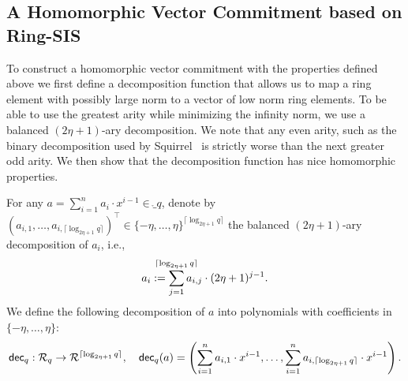 \subsection{A Homomorphic Vector Commitment based on Ring-SIS}
To construct a homomorphic vector commitment with the properties defined above we first define a decomposition function that allows us to map a ring element with possibly large norm to a vector of low norm ring elements.
To be able to use the greatest arity while minimizing the infinity norm, we use a balanced $(2\eta+1)$-ary decomposition.
We note that any even arity, such as the binary decomposition used by Squirrel~\cite{CCS:FleSimZha22} is strictly worse than the next greater odd arity.
We then show that the decomposition function has nice homomorphic properties.
\begin{definition}
    For any $a = \sum_{i=1}^{n} a_i\cdot x^{i-1}  \in \ring_q$,
    denote by $(a_{i,1},\dots,a_{i,\lceil \log_{2\eta+1} q \rceil})^\intercal\in \{-\eta,\dots,\eta\}^{\lceil\log_{2\eta+1} q\rceil}$ the balanced $(2\eta+1)$-ary decomposition of $a_i$, i.e.,
    \[a_{i} := \smashoperator{\sum_{j=1}^{\lceil\log_{2\eta+1} q\rceil}} a_{i,j}\cdot (2\eta+1)^{j-1}.\]
    We define the following decomposition of $a$ into polynomials with coefficients in $\{-\eta,\dots,\eta\}$:
    \begin{equation*}
        \mathsf{dec}_q: \mathcal{R}_q \to \mathcal{R}^{\lceil\log_{2\eta+1} q\rceil},\quad
        \mathsf{dec}_q(a) = \left(\sum_{i=1}^{n} a_{i,1}\cdot x^{i-1}, \dots, \sum_{i=1}^{n} a_{i,\lceil\log_{2\eta+1} q\rceil}\cdot x^{i-1} \right).
    \end{equation*}
\end{definition}

